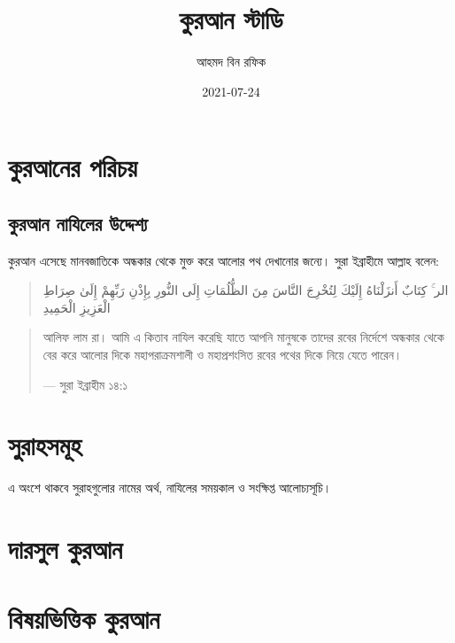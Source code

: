 \documentclass[
]{book}
\title{কুরআন স্টাডি}
\author{আহমদ বিন রফিক}
\date{2021-07-24}
\begin{document}
\maketitle

{
\setcounter{tocdepth}{1}
\tableofcontents
}
\hypertarget{about-quran}{%
\chapter*{কুরআনের পরিচয়}\label{about-quran}}

\hypertarget{why-quran-was-revealed}{%
\section*{কুরআন নাযিলের উদ্দেশ্য}\label{why-quran-was-revealed}}

কুরআন এসেছে মানবজাতিকে অন্ধকার থেকে মুক্ত করে আলোর পথ দেখানোর জন্যে। সুরা ইব্রাহীমে আল্লাহ বলেন:

\begin{quote}
الر ۚ كِتَابٌ أَنزَلْنَاهُ إِلَيْكَ لِتُخْرِجَ النَّاسَ مِنَ الظُّلُمَاتِ إِلَى النُّورِ بِإِذْنِ رَبِّهِمْ إِلَىٰ صِرَاطِ الْعَزِيزِ الْحَمِيدِ
\end{quote}

\begin{quote}
আলিফ লাম রা। আমি এ কিতাব নাযিল করেছি যাতে আপনি মানুষকে তাদের রবের নির্দেশে অন্ধকার থেকে বের করে আলোর দিকে মহাপরাক্রমশালী ও মহাপ্রশংসিত রবের পথের দিকে নিয়ে যেতে পারেন।

--- সুরা ইব্রাহীম ১৪:১
\end{quote}

\hypertarget{surah}{%
\chapter*{সুরাহসমূহ}\label{surah}}

এ অংশে থাকবে সুরাহগুলোর নামের অর্থ, নাযিলের সময়কাল ও সংক্ষিপ্ত আলোচ্যসূচি।

\hypertarget{dars}{%
\chapter*{দারসুল কুরআন}\label{dars}}

\hypertarget{quran-index}{%
\chapter*{বিষয়ভিত্তিক কুরআন}\label{quran-index}}
\end{document}
